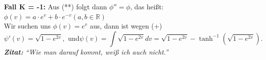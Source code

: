 \begin{solution}
\begin{enumerate}[label= (\alph*)]
    
    \textbf{Fall K = -1:} Aus (**) folgt dann \( \phi'' = \phi \), das heißt: \\
    \( \phi(v) = a \cdot e^v + b \cdot e^{-v} (a,b \in \mathbb{R}) \)  \\
    Wir suchen uns \( \phi(v) = e^v \) aus, dann ist wegen (+)
    \begin{equation*}
      \psi'(v) = \sqrt{ 1- e^{2v}}, \text{ und} \psi(v) = \int{ \sqrt{ 1 - e^{2v}}}dv = \sqrt{ 1 - e^{2v}} -\tanh^{-1}(\sqrt{ 1- e^{2v}}).
    \end{equation*}
    \emph{\textbf{Zitat:}} \emph{``Wie man darauf kommt, weiß ich auch nicht.''}
    
  \end{enumerate} 
\end{solution}

